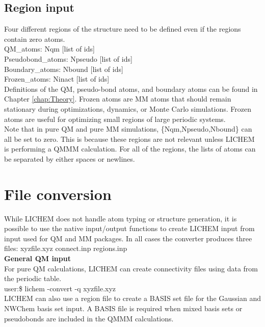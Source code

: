 \documentclass[12pt]{report}
\begin{document}
\subsection{Region input}

Four different regions of the structure need to be defined even if the
regions contain zero atoms. \\

QM\_atoms: Nqm [list of ids] \\
Pseudobond\_atoms: Npseudo [list of ids] \\
Boundary\_atoms: Nbound [list of ids] \\
Frozen\_atoms: Ninact [list of ids] \\

Definitions of the QM, pseudo-bond atoms, and boundary atoms can be found in
Chapter \ref{chap:Theory}.
Frozen atoms are MM atoms that should remain stationary during optimizations,
dynamics, or Monte Carlo simulations.
Frozen atoms are useful for optimizing small regions of large periodic
systems. \\

Note that in pure QM and pure MM simulations, \{Nqm,Npseudo,Nbound\} can all
be set to zero.
This is because these regions are not relevant unless LICHEM is performing a
QMMM calculation.
For all of the regions, the lists of atoms can be separated by either spaces
or newlines.

\section{File conversion}

While LICHEM does not handle atom typing or structure generation, it is
possible to use the native input/output functions to create LICHEM input from
input used for QM and MM packages.
In all cases the converter produces three files: xyzfile.xyz connect.inp
regions.inp \\

{\textbf{General QM input}} \\

For pure QM calculations, LICHEM can create connectivity files using data
from the periodic table. \\

user:\$ lichem -convert -q xyzfile.xyz \\

LICHEM can also use a region file to create a BASIS set file for the Gaussian
and NWChem basis set input.
A BASIS file is required when mixed basis sets or pseudobonds are included
in the QMMM calculations. \\
\end{document}
